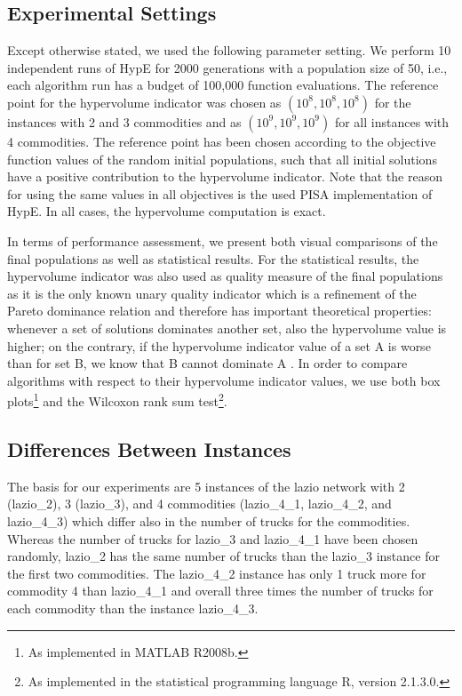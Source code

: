 \documentclass[preprint,12pt]{elsarticle}
\begin{document}
\subsection{Experimental Settings}
Except otherwise stated, we used the following parameter setting. We perform 10 independent runs of HypE for 2000 generations with a population size of 50, i.e., each algorithm run has a budget of 100,000 function evaluations. The reference point for the hypervolume indicator was chosen as $(10^8, 10^8, 10^8)$ for the instances with 2 and 3 commodities and as $(10^9, 10^9, 10^9)$ for all instances with 4 commodities. The reference point has been chosen according to the objective function values of the random initial populations, such that all initial solutions have a positive contribution to the hypervolume indicator. Note that the reason for using the same values in all objectives is the used PISA implementation of HypE. In all cases, the hypervolume computation is exact.

In terms of performance assessment, we present both visual comparisons of the final populations as well as statistical results. For the statistical results, the hypervolume indicator was also used as quality measure of the final populations as it is the only known unary quality indicator  which is a refinement of the Pareto dominance relation and therefore has important theoretical properties: whenever a set of solutions dominates another set, also the hypervolume value is higher; on the contrary, if the hypervolume indicator value of a set A is worse than for set B, we know that B cannot dominate A \citep{ztlf2003a,ztb2010a}. In order to compare algorithms with respect to their hypervolume indicator values, we use both box plots\footnote{As implemented in MATLAB R2008b.} and the Wilcoxon rank sum test\footnote{As implemented in the statistical programming language R, version 2.1.3.0.}.


\subsection{Differences Between Instances}
The basis for our experiments are 5 instances of the lazio network with 2 (lazio\_2), 3 (lazio\_3), and 4 commodities (lazio\_4\_1, lazio\_4\_2, and lazio\_4\_3) which differ also in the number of trucks for the commodities. Whereas the number of trucks for lazio\_3 and lazio\_4\_1 have been chosen randomly, lazio\_2 has the same number of trucks than the lazio\_3 instance for the first two commodities. The lazio\_4\_2 instance has only 1 truck more for commodity 4 than lazio\_4\_1 and overall three times the number of trucks for each commodity than the instance lazio\_4\_3.
\end{document}
